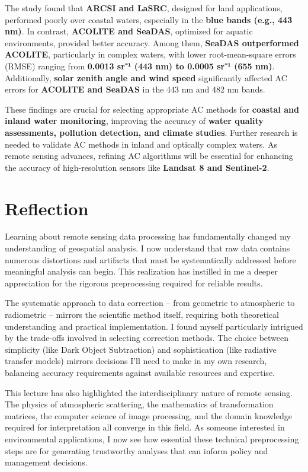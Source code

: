 \documentclass[
  letterpaper,
]{scrbook}
\begin{document}
The study found that \textbf{ARCSI and LaSRC}, designed for land
applications, performed poorly over coastal waters, especially in the
\textbf{blue bands (e.g., 443 nm)}. In contrast, \textbf{ACOLITE and
SeaDAS}, optimized for aquatic environments, provided better accuracy.
Among them, \textbf{SeaDAS outperformed ACOLITE}, particularly in
complex waters, with lower root-mean-square errors (RMSE) ranging from
\textbf{0.0013 sr⁻¹ (443 nm) to 0.0005 sr⁻¹ (655 nm)}. Additionally,
\textbf{solar zenith angle and wind speed} significantly affected AC
errors for \textbf{ACOLITE and SeaDAS} in the 443 nm and 482 nm bands.

These findings are crucial for selecting appropriate AC methods for
\textbf{coastal and inland water monitoring}, improving the accuracy of
\textbf{water quality assessments, pollution detection, and climate
studies}. Further research is needed to validate AC methods in inland
and optically complex waters. As remote sensing advances, refining AC
algorithms will be essential for enhancing the accuracy of
high-resolution sensors like \textbf{Landsat 8 and Sentinel-2}.


\chapter{Reflection}\label{reflection-1}

Learning about remote sensing data processing has fundamentally changed
my understanding of geospatial analysis. I now understand that raw data
contains numerous distortions and artifacts that must be systematically
addressed before meaningful analysis can begin. This realization has
instilled in me a deeper appreciation for the rigorous preprocessing
required for reliable results.

The systematic approach to data correction -- from geometric to
atmospheric to radiometric -- mirrors the scientific method itself,
requiring both theoretical understanding and practical implementation. I
found myself particularly intrigued by the trade-offs involved in
selecting correction methods. The choice between simplicity (like Dark
Object Subtraction) and sophistication (like radiative transfer models)
mirrors decisions I'll need to make in my own research, balancing
accuracy requirements against available resources and expertise.

This lecture has also highlighted the interdisciplinary nature of remote
sensing. The physics of atmospheric scattering, the mathematics of
transformation matrices, the computer science of image processing, and
the domain knowledge required for interpretation all converge in this
field. As someone interested in environmental applications, I now see
how essential these technical preprocessing steps are for generating
trustworthy analyses that can inform policy and management decisions.
\end{document}
